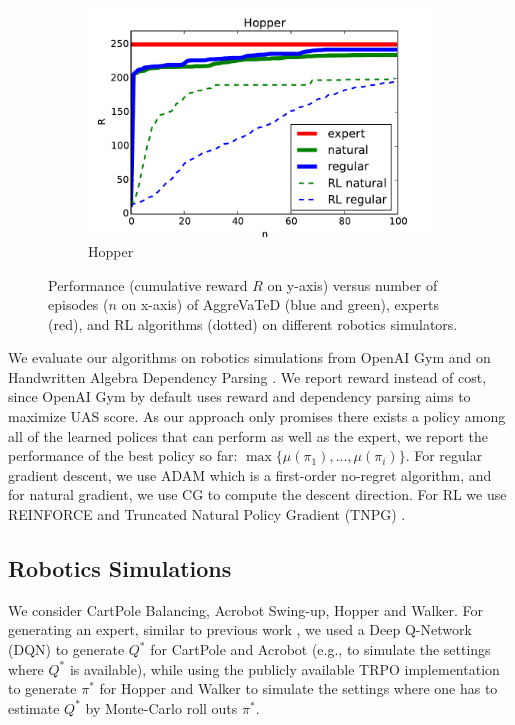 \documentclass{article}
\begin{document}
\begin{figure}[t!]
\begin{subfigure}[l]{0.1962\textwidth}
        \includegraphics[width=1.12\textwidth,keepaspectratio]{./figure/Hopper_comparison.pdf}
        \caption{Hopper}
        \label{fig:hopper}
    \end{subfigure}
    \caption{Performance (cumulative reward $R$ on y-axis) versus number of episodes ($n$ on x-axis) of AggreVaTeD (blue and green), experts (red), and RL algorithms (dotted) on different robotics simulators. }
    \label{fig:perf_robotics}
\end{figure}
We evaluate our algorithms on robotics simulations from OpenAI Gym \cite{brockman2016openai} and on Handwritten Algebra Dependency Parsing \cite{duyckpredicting}. We report reward instead of cost, since OpenAI Gym by default uses reward and dependency parsing aims to maximize UAS score.  As our approach only promises there exists a policy among all of the learned polices that can perform as well as the expert, we report the performance of the best policy so far: $ \max\{\mu(\pi_1), ..., \mu(\pi_i)\}$. For regular gradient descent, we use ADAM \cite{kingma2014adam} which is a first-order no-regret algorithm, and for natural gradient, we use CG to compute the descent direction. For RL we use REINFORCE \cite{williams1992simple} and Truncated Natural Policy Gradient (TNPG) \cite{duan2016benchmarking}.


\subsection{Robotics Simulations}
We consider CartPole Balancing, Acrobot Swing-up, Hopper and Walker. For generating an expert, similar to previous work \cite{ho2016generative}, we used a Deep Q-Network (DQN) to generate $Q^*$ for CartPole and Acrobot (e.g., to simulate the settings where $Q^*$ is available), while using the publicly available TRPO implementation to generate $\pi^*$ for Hopper and Walker to simulate the settings where one has to estimate $Q^*$ by Monte-Carlo roll outs $\pi^*$. %
\end{document}
